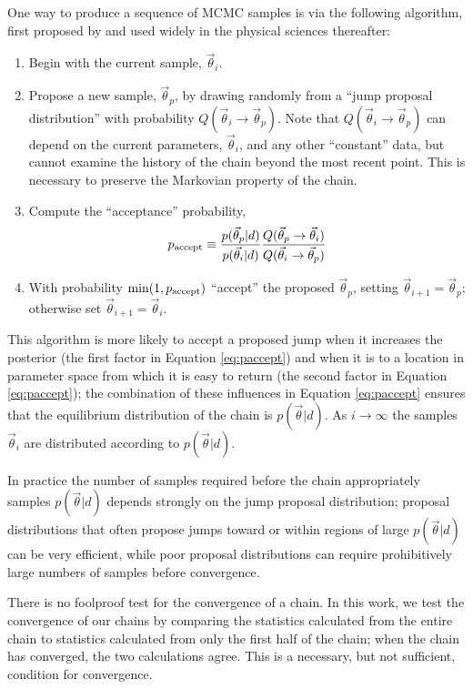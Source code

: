 \documentclass[preprint]{aastex}
\newcommand{\vtheta}{\vec{\theta}}
\begin{document}
One way to produce a sequence of MCMC samples is via the following
algorithm, first proposed by \citet{Metropolis1953} and used widely in
the physical sciences thereafter:
\begin{enumerate}
  \item Begin with the current sample, $\vtheta_i$.
  \item Propose a new sample, $\vtheta_p$, by drawing randomly from a
    ``jump proposal distribution'' with probability $Q(\vtheta_i \to
    \vtheta_p)$.  Note that $Q(\vtheta_i \to \vtheta_p)$ can depend on
    the current parameters, $\vtheta_i$, and any other ``constant''
    data, but cannot examine the history of the chain beyond the most
    recent point.  This is necessary to preserve the Markovian
    property of the chain.
  \item Compute the ``acceptance'' probability,
    \begin{equation}
      \label{eq:paccept}
      p_{\textnormal{accept}} \equiv
      \frac{p(\vtheta_p|d)}{p(\vtheta_i|d)} \frac{Q(\vtheta_p \to
        \vtheta_i)}{Q(\vtheta_i \to \vtheta_p)}
    \end{equation}
  \item With probability $\min(1,p_{\textnormal{accept}})$ ``accept''
    the proposed $\vtheta_p$, setting $\vtheta_{i+1} = \vtheta_p$;
    otherwise set $\vtheta_{i+1} = \vtheta_i$.
\end{enumerate}
This algorithm is more likely to accept a proposed jump when it
increases the posterior (the first factor in Equation
\eqref{eq:paccept}) and when it is to a location in parameter space
from which it is easy to return (the second factor in Equation
\eqref{eq:paccept}); the combination of these influences in Equation
\eqref{eq:paccept} ensures that the equilibrium distribution of the
chain is $p(\vtheta|d)$.  As $i \to \infty$ the samples $\vtheta_i$
are distributed according to $p(\vtheta|d)$.  

In practice the number of samples required before the chain
appropriately samples $p(\vtheta|d)$ depends strongly on the jump
proposal distribution; proposal distributions that often propose jumps
toward or within regions of large $p(\vtheta|d)$ can be very
efficient, while poor proposal distributions can require prohibitively
large numbers of samples before convergence.  

There is no foolproof test for the convergence of a chain.  In this
work, we test the convergence of our chains by comparing the
statistics calculated from the entire chain to statistics calculated
from only the first half of the chain; when the chain has converged,
the two calculations agree.  This is a necessary, but not sufficient,
condition for convergence.
\end{document}
